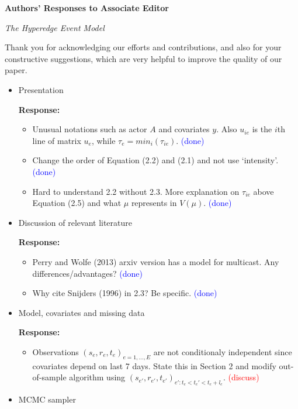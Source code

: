 \documentclass[12pt]{article}
\date{\today}
\theoremstyle{definition}
\begin{document}


\begin{center}
\textbf{Authors' Responses to Associate Editor}
\end{center}
\begin{center}
\textsl{The Hyperedge Event Model}
\end{center}

Thank you for acknowledging our efforts and contributions, and also for your constructive suggestions, which are very helpful to improve the quality of our paper. 

\begin{itemize}
	\item Presentation

	\textbf{  Response:} 
	\begin{itemize}
		\item Unusual notations such as actor $A$ and covariates $y$. Also $u_{ie}$ is the $i$th line of matrix $u_e$, while $\tau_e = min_i(\tau_{ie})$.  \textcolor{blue}{(done)}
		\item Change the order of Equation (2.2) and (2.1) and not use `intensity'. \textcolor{blue}{(done)}
		\item Hard to understand 2.2 without 2.3. More explanation on $\tau_{ie}$ above Equation (2.5) and what $\mu$ represents in $V(\mu)$. \textcolor{blue}{(done)}
	\end{itemize}

	\item Discussion of relevant literature

	\textbf{  Response:} 
	\begin{itemize}
		\item Perry and Wolfe (2013) arxiv version has a model for multicast. Any differences/advantages? \textcolor{blue}{(done)}
		\item Why cite Snijders (1996) in 2.3? Be specific. \textcolor{blue}{(done)}
	\end{itemize}
	
	\item Model, covariates and missing data
	
		\textbf{  Response:} 
		\begin{itemize}
			\item Observations $(s_e, r_e, t_e)_{e=1,\ldots,E}$ are not conditionaly independent since covariates depend on last 7 days. State this in Section 2 and modify out-of-sample algorithm using $(s_{e'}, r_{e'}, t_{e'})_{e':t_e<t_e'<t_e+l_e}$.  \textcolor{red}{(discuss)} 
		\end{itemize}
	\item MCMC sampler
	

\end{itemize}
\end{document}
